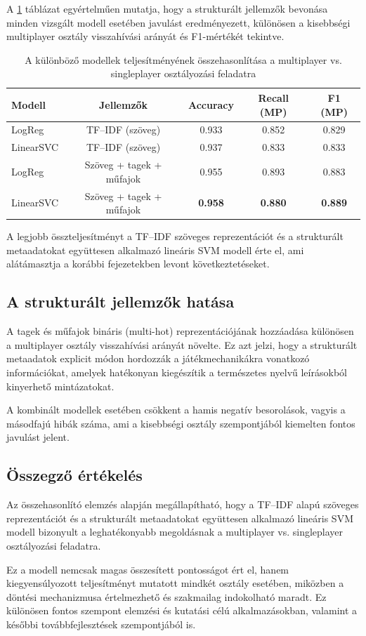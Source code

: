 A \ref{tab:mp_models} táblázat egyértelműen mutatja,
hogy a strukturált jellemzők bevonása minden vizsgált modell esetében
javulást eredményezett, különösen a kisebbségi multiplayer osztály
visszahívási arányát és F1-mértékét tekintve.

\begin{table}[H]
\centering
\caption{A különböző modellek teljesítményének összehasonlítása a multiplayer vs. singleplayer osztályozási feladatra}
\label{tab:mp_models}
\begin{tabular}{lcccc}
\hline
\textbf{Modell} & \textbf{Jellemzők} & \textbf{Accuracy} & \textbf{Recall (MP)} & \textbf{F1 (MP)} \\
\hline
LogReg & TF--IDF (szöveg) & 0.933 & 0.852 & 0.829 \\
LinearSVC & TF--IDF (szöveg) & 0.937 & 0.833 & 0.833 \\
LogReg & Szöveg + tagek + műfajok & 0.955 & 0.893 & 0.883 \\
LinearSVC & Szöveg + tagek + műfajok & \textbf{0.958} & \textbf{0.880} & \textbf{0.889} \\
\hline
\end{tabular}
\end{table}

A legjobb összteljesítményt a TF--IDF szöveges reprezentációt
és a strukturált metaadatokat együttesen alkalmazó
lineáris SVM modell érte el,
ami alátámasztja a korábbi fejezetekben levont következtetéseket.

\subsection{A strukturált jellemzők hatása}

A tagek és műfajok bináris (multi-hot) \cite{multi-hot} reprezentációjának hozzáadása
különösen a multiplayer osztály visszahívási arányát növelte.
Ez azt jelzi, hogy a strukturált metaadatok
explicit módon hordozzák a játékmechanikákra vonatkozó információkat,
amelyek hatékonyan kiegészítik
a természetes nyelvű leírásokból kinyerhető mintázatokat.

A kombinált modellek esetében
csökkent a hamis negatív besorolások,
vagyis a másodfajú hibák száma,
ami a kisebbségi osztály szempontjából
kiemelten fontos javulást jelent.

\subsection{Összegző értékelés}

Az összehasonlító elemzés alapján megállapítható,
hogy a TF--IDF \cite{tf-idf} alapú szöveges reprezentációt
és a strukturált metaadatokat együttesen alkalmazó
lineáris SVM \cite{svm} modell bizonyult a leghatékonyabb megoldásnak
a multiplayer vs. singleplayer osztályozási feladatra.

Ez a modell nemcsak magas összesített pontosságot ért el,
hanem kiegyensúlyozott teljesítményt mutatott mindkét osztály esetében,
miközben a döntési mechanizmusa
értelmezhető és szakmailag indokolható maradt.
Ez különösen fontos szempont
elemzési és kutatási célú alkalmazásokban,
valamint a későbbi továbbfejlesztések szempontjából is.
